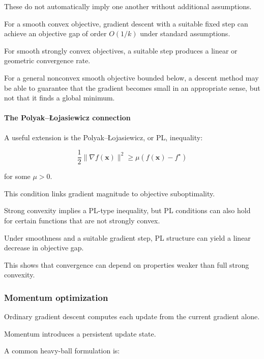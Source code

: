 These do not automatically imply one another without additional assumptions.

For a smooth convex objective, gradient descent with a suitable fixed step can achieve an objective gap of order \(O(1/k)\) under standard assumptions.

For smooth strongly convex objectives, a suitable step produces a linear or geometric convergence rate.

For a general nonconvex smooth objective bounded below, a descent method may be able to guarantee that the gradient becomes small in an appropriate sense, but not that it finds a global minimum.

\paragraph{The Polyak--Łojasiewicz connection}\label{02-foundations-ii-ch026-the-polyakux142ojasiewicz-connection}

\hypertarget{02-foundations-ii-ch026-the-polyakłojasiewicz-connection}{}

A useful extension is the Polyak--Łojasiewicz, or PL, inequality:

\[
\frac12\|\nabla f(\mathbf x)\|^2 \ge \mu(f(\mathbf x)-f^\star)
\]

for some \(\mu>0\).

This condition links gradient magnitude to objective suboptimality.

Strong convexity implies a PL-type inequality, but PL conditions can also hold for certain functions that are not strongly convex.

Under smoothness and a suitable gradient step, PL structure can yield a linear decrease in objective gap.

This shows that convergence can depend on properties weaker than full strong convexity.

\subsubsection{Momentum optimization}\label{02-foundations-ii-ch026-momentum-optimization}

\hypertarget{02-foundations-ii-ch026-momentum-optimization}{}

Ordinary gradient descent computes each update from the current gradient alone.

Momentum introduces a persistent update state.

A common heavy-ball formulation is:

